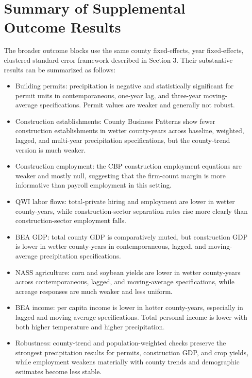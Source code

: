 \documentclass[12pt]{article}
\begin{document}
\section{Summary of Supplemental Outcome Results}

The broader outcome blocks use the same county fixed-effects, year fixed-effects, clustered standard-error framework described in Section 3. Their substantive results can be summarized as follows:
\begin{itemize}[leftmargin=1.2em]
\item Building permits: precipitation is negative and statistically significant for permit units in contemporaneous, one-year lag, and three-year moving-average specifications. Permit values are weaker and generally not robust.
\item Construction establishments: County Business Patterns show fewer construction establishments in wetter county-years across baseline, weighted, lagged, and multi-year precipitation specifications, but the county-trend version is much weaker.
\item Construction employment: the CBP construction employment equations are weaker and mostly null, suggesting that the firm-count margin is more informative than payroll employment in this setting.
\item QWI labor flows: total-private hiring and employment are lower in wetter county-years, while construction-sector separation rates rise more clearly than construction-sector employment falls.
\item BEA GDP: total county GDP is comparatively muted, but construction GDP is lower in wetter county-years in contemporaneous, lagged, and moving-average precipitation specifications.
\item NASS agriculture: corn and soybean yields are lower in wetter county-years across contemporaneous, lagged, and moving-average specifications, while acreage responses are much weaker and less uniform.
\item BEA income: per capita income is lower in hotter county-years, especially in lagged and moving-average specifications. Total personal income is lower with both higher temperature and higher precipitation.
\item Robustness: county-trend and population-weighted checks preserve the strongest precipitation results for permits, construction GDP, and crop yields, while employment weakens materially with county trends and demographic estimates become less stable.
\end{itemize}
\end{document}
